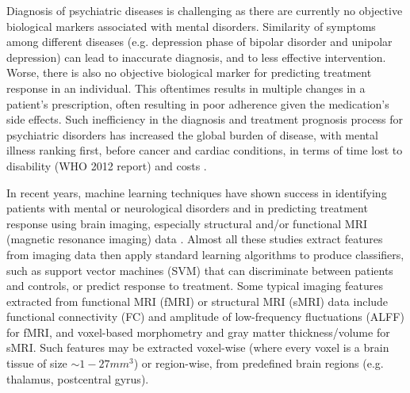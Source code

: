 \documentclass{article}
\begin{document}
Diagnosis of psychiatric diseases is challenging as there are currently no objective biological markers associated with mental disorders. Similarity of symptoms among different diseases (e.g. depression phase of bipolar disorder and unipolar depression) can lead to inaccurate diagnosis, and to less effective intervention. Worse, there is also no objective biological marker for predicting treatment response in an individual. This oftentimes results in multiple changes in a patient's prescription, often resulting in poor adherence given the medication's side effects. Such inefficiency in the diagnosis and treatment prognosis process for psychiatric disorders has increased the global burden of disease, with mental illness ranking first, before cancer and cardiac conditions, in terms of time lost to disability (WHO 2012 report) and costs \citep{Roehrig2016}.

In recent years, machine learning techniques have shown success in identifying patients with mental or neurological disorders and in predicting treatment response using brain imaging, especially structural and/or functional MRI (magnetic resonance imaging) data \citep{Orru2012, Zarogianni2013, Koutsouleris2016, Vieira2017, Gheiratmand2017}. Almost all these studies extract features from imaging data then apply standard learning algorithms to produce classifiers, such as support vector machines (SVM) \citep{Orru2012, Wolfers2015} that can discriminate between patients and controls, or predict response to treatment.
Some typical imaging features extracted from functional MRI (fMRI) or structural MRI (sMRI) data include functional connectivity (FC) and amplitude of low-frequency fluctuations (ALFF) for fMRI, and voxel-based morphometry and gray matter thickness/volume for sMRI. Such features may be extracted voxel-wise (where every voxel is a brain tissue of size $ \sim 1-27 mm^3$) or region-wise, from predefined brain regions (e.g. thalamus, postcentral gyrus).
\end{document}
